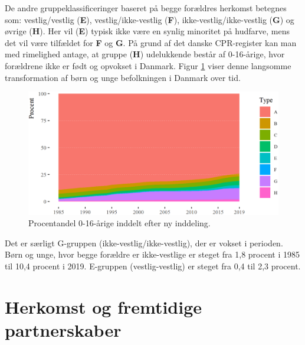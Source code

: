 \documentclass[
]{book}
\begin{document}
De andre gruppeklassificeringer baseret på begge forældres herkomst betegnes som: vestlig/vestlig (\textbf{E}), vestlig/ikke-vestlig (\textbf{F}), ikke-vestlig/ikke-vestlig (\textbf{G}) og øvrige (\textbf{H}). Her vil (\textbf{E}) typisk ikke være en synlig minoritet på hudfarve, mens det vil være tilfældet for \textbf{F} og \textbf{G}. På grund af det danske CPR-register kan man med rimelighed antage, at gruppe (\textbf{H}) udelukkende består af 0-16-årige, hvor forældrene ikke er født og opvokset i Danmark. Figur \ref{fig:fig-3-01} viser denne langsomme transformation af børn og unge befolkningen i Danmark over tid.

\begin{figure}
\includegraphics[width=1\linewidth]{images/figur_3_1} \caption{ Procentandel 0-16-årige inddelt efter ny inddeling.}\label{fig:fig-3-01}
\end{figure}

Det er særligt G-gruppen (ikke-vestlig/ikke-vestlig), der er vokset i perioden. Børn og unge, hvor begge forældre er ikke-vestlige er steget fra 1,8 procent i 1985 til 10,4 procent i 2019. E-gruppen (vestlig-vestlig) er steget fra 0,4 til 2,3 procent.

\section{Herkomst og fremtidige partnerskaber}\label{herkomst-og-fremtidige-partnerskaber}
\end{document}

